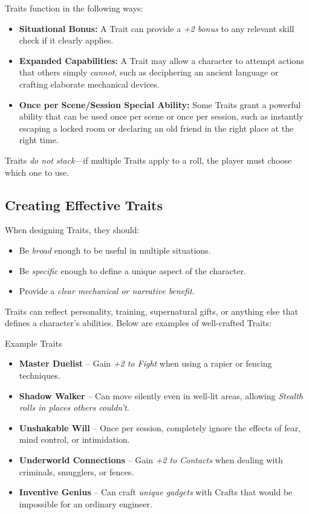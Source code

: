 Traits function in the following ways:

\begin{itemize}
    \item \textbf{Situational Bonus:} A Trait can provide a \emph{+2 bonus} to any relevant skill check if it clearly applies.
    \item \textbf{Expanded Capabilities:} A Trait may allow a character to attempt actions that others simply \emph{cannot}, such as deciphering an ancient language or crafting elaborate mechanical devices.
    \item \textbf{Once per Scene/Session Special Ability:} Some Traits grant a powerful ability that can be used once per scene or once per session, such as instantly escaping a locked room or declaring an old friend in the right place at the right time.
\end{itemize}

Traits \emph{do not stack}—if multiple Traits apply to a roll, the player must choose which one to use.

\subsection{Creating Effective Traits}

When designing Traits, they should:
\begin{itemize}
    \item Be \emph{broad} enough to be useful in multiple situations.
    \item Be \emph{specific} enough to define a unique aspect of the character.
    \item Provide a \emph{clear mechanical or narrative benefit}.
\end{itemize}

Traits can reflect personality, training, supernatural gifts, or anything else that defines a character’s abilities. Below are examples of well-crafted Traits:

\begin{DndSidebar}[float=!t]{Example Traits}
    \begin{itemize}
        \item \textbf{Master Duelist} – Gain \emph{+2 to Fight} when using a rapier or fencing techniques.
        \item \textbf{Shadow Walker} – Can move silently even in well-lit areas, allowing \emph{Stealth rolls in places others couldn’t}.
        \item \textbf{Unshakable Will} – Once per session, completely ignore the effects of fear, mind control, or intimidation.
        \item \textbf{Underworld Connections} – Gain \emph{+2 to Contacts} when dealing with criminals, smugglers, or fences.
        \item \textbf{Inventive Genius} – Can craft \emph{unique gadgets} with Crafts that would be impossible for an ordinary engineer.
    \end{itemize}
\end{DndSidebar}

